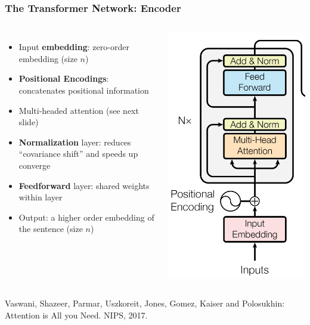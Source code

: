 \documentclass[10pt]{beamer}
\begin{document}
\begin{frame}
  \frametitle{The Transformer Network: Encoder}
  \begin{columns}
\begin{itemize}
\setlength\itemsep{.8em}
\item Input \textbf{embedding}: zero-order embedding (size $n$)
\item \textbf{Positional Encodings}: concatenates positional information
\item {\color{red} Multi-headed attention} (see next slide)
\item \textbf{Normalization} layer: reduces ``covariance shift'' and speeds up converge
\item \textbf{Feedforward} layer: shared weights within layer 
\item Output: a higher order embedding of the sentence (size $n$)
\end{itemize}
\begin{center}
	\includegraphics[width=.8\columnwidth]{images/enc}
\end{center}
    \end{columns}
\vspace{.75cm}
\scriptsize{Vaswani, Shazeer, Parmar, Uszkoreit, Jones, Gomez, Kaiser and Polosukhin: Attention is All you Need. NIPS, 2017.}
\end{frame}
\end{document}

